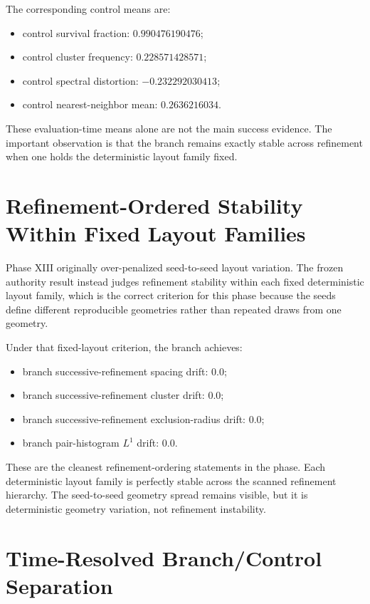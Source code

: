 \documentclass[11pt]{article}
\begin{document}
The corresponding control means are:
\begin{itemize}
\item control survival fraction: $0.990476190476$;
\item control cluster frequency: $0.228571428571$;
\item control spectral distortion: $-0.232292030413$;
\item control nearest-neighbor mean: $0.2636216034$.
\end{itemize}

These evaluation-time means alone are not the main success evidence. The important observation is that the branch remains exactly stable across refinement when one holds the deterministic layout family fixed.

\section{Refinement-Ordered Stability Within Fixed Layout Families}

Phase XIII originally over-penalized seed-to-seed layout variation. The frozen authority result instead judges refinement stability within each fixed deterministic layout family, which is the correct criterion for this phase because the seeds define different reproducible geometries rather than repeated draws from one geometry.

Under that fixed-layout criterion, the branch achieves:
\begin{itemize}
\item branch successive-refinement spacing drift: $0.0$;
\item branch successive-refinement cluster drift: $0.0$;
\item branch successive-refinement exclusion-radius drift: $0.0$;
\item branch pair-histogram $L^1$ drift: $0.0$.
\end{itemize}

These are the cleanest refinement-ordering statements in the phase. Each deterministic layout family is perfectly stable across the scanned refinement hierarchy. The seed-to-seed geometry spread remains visible, but it is deterministic geometry variation, not refinement instability.

\section{Time-Resolved Branch/Control Separation}
\end{document}
